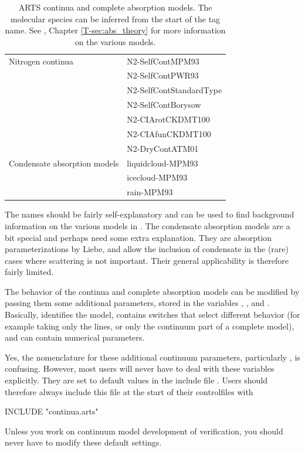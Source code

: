 \begin{table}
\begin{tabular}{ll}
Nitrogen continua & N2-SelfContMPM93 \\
& N2-SelfContPWR93 \\
& N2-SelfContStandardType \\
& N2-SelfContBorysow \\
& N2-CIArotCKDMT100 \\
& N2-CIAfunCKDMT100 \\
& N2-DryContATM01 \\[1ex]

Condensate absorption models & liquidcloud-MPM93 \\
& icecloud-MPM93 \\
& rain-MPM93 \\

\hline  
\end{tabular}
\caption{ARTS continua and complete absorption models. The molecular
  species can be inferred from the start of the tag name.  See
  \theory, Chapter \ref{T-sec:abs_theory} for more information on the
  various models.}
\label{tab:absorption:continua}
\end{table}

The names should be fairly self-explanatory and can be used to find
background information on the various models in \theory.  The
condensate absorption models are a bit special and perhaps need some
extra explanation. They are absorption parameterizations by Liebe, and
allow the inclusion of condensate in the (rare) cases where scattering
is not important. Their general applicability is therefore fairly limited.

The behavior of the continua and complete absorption models can be
modified by passing them some additional parameters, stored in the
variables , ,
and . Basically,
 identifies the model,
 contains switches that select different
behavior (for example taking only the lines, or only the continuum
part of a complete model), and  can
contain numerical parameters. 

Yes, the nomenclature for these additional continuum parameters,
particularly , is confusing. However,
most users will never have to deal with these variables
explicitly. They are set to default values in the include file
. Users should therefore always include this file  at
the start of their controlfiles with
\begin{code}
  INCLUDE "continua.arts"
\end{code}
Unless you work on continuum model development of verification, you
should never have to modify these default settings.


